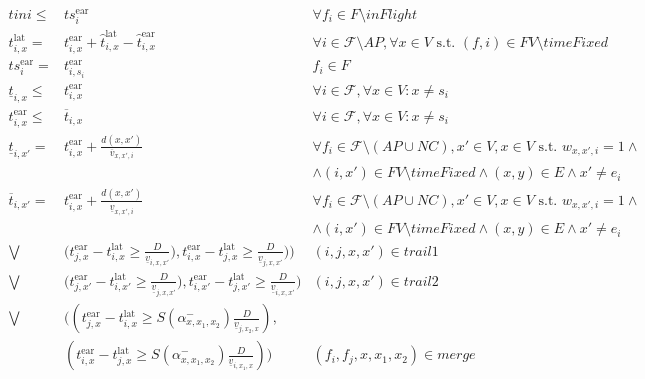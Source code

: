 \documentclass[../thesis.tex]{subfiles}
\begin{document}
\tiny
\begin{align}%
    tini \leq & ts^\text{ear}_i &\forall f_i\in F\setminus inFlight\\
    t^\text{lat}_{i,x}=& t^\text{ear}_{i,x}+\hat t^\text{lat}_{i,x} -\hat t^\text{ear}_{i,x}& \forall i\in \mathcal F\setminus AP, \forall x \in V \text{ s.t. }(f,i)\in FV\setminus timeFixed\\
    ts^\text{ear}_i = &t^\text{ear}_{i,s_i} & f_i\in F\\
    \underline t_{i,x} \leq& t^\text{ear}_{i,x}
    &\forall i \in \mathcal F, \forall x\in V: x\neq s_i\\
    t^\text{ear}_{i,x} \leq& \overline t_{i,x}
    &\forall i\in \mathcal F,\forall x\in V: x\neq s_i\\
    \underline t_{i,x'}=&t^\text{ear}_{i,x}+\frac{d(x,x')}{\overline v_{x,x',i}}
    &\forall f_i\in \mathcal F\setminus (AP\cup NC), x'\in V, x \in V\text{ s.t. } w_{x,x',i}=1\land \nonumber\\&&
    \land (i,x')\in FV\setminus timeFixed \land (x,y)\in E \land x'\neq e_i\\
    \overline t_{i,x'}=&t^\text{ear}_{i,x}+\frac{d(x,x')}{\underline v_{x,x',i}}
    &\forall f_i\in \mathcal F\setminus (AP\cup NC), x'\in V, x \in V\text{ s.t. } w_{x,x',i}=1\land \nonumber\\&&
    \land (i,x')\in FV\setminus timeFixed \land (x,y)\in E \land x'\neq e_i\\
    \bigvee&\Big(
    t^\text{ear}_{j,x}-t^\text{lat}_{i,x}\geq \frac D{\underline v_{i,x,x'}}), %
    t^\text{ear}_{i,x}-t^\text{lat}_{j,x}\geq \frac D{\underline v_{j,x,x'}})\Big) & (i,j,x,x')\in trail1 \\
    \bigvee&\Big(
    t^\text{ear}_{j,x'}-t^\text{lat}_{i,x'}\geq \frac D {\underline v_{j,x,x'}}), %
    t^\text{ear}_{i,x'}-t^\text{lat}_{j,x'}\geq \frac D {\underline v_{i,x,x'}}\Big)
    & (i,j,x,x')\in trail2\\
    \bigvee &\Bigg(
    \left(t^\text{ear}_{j,x} - t^\text{lat}_{i,x} \geq S(\alpha^-_{x,x_1,x_2}) \frac{D}{\underline{v}_{j,x_2,x}}\right)
    ,\nonumber\\ 
    & \left(t^\text{ear}_{i,x} - t^\text{lat}_{j,x} \geq S(\alpha^-_{x,x_1,x_2}) \frac{D}{\underline{v}_{i,x_1,x}}\right)
    \Bigg)
    &  (f_i,f_j,x,x_1,x_2)\in merge\\

\end{align}
\end{document}
